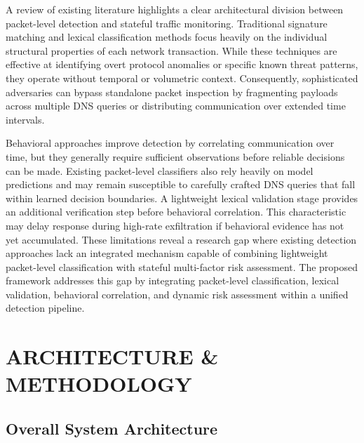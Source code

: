 \documentclass[14pt, a4paper, oneside]{report}
\begin{document}
A review of existing literature highlights a clear architectural division between packet-level detection and stateful traffic monitoring. Traditional signature matching and lexical classification methods focus heavily on the individual structural properties of each network transaction. While these techniques are effective at identifying overt protocol anomalies or specific known threat patterns, they operate without temporal or volumetric context. Consequently, sophisticated adversaries can bypass standalone packet inspection by fragmenting payloads across multiple DNS queries or distributing communication over extended time intervals.

Behavioral approaches improve detection by correlating communication over time, but they generally require sufficient observations before reliable decisions can be made. Existing packet-level classifiers also rely heavily on model predictions and may remain susceptible to carefully crafted DNS queries that fall within learned decision boundaries. A lightweight lexical validation stage provides an additional verification step before behavioral correlation. This characteristic may delay response during high-rate exfiltration if behavioral evidence has not yet accumulated. These limitations reveal a research gap where existing detection approaches lack an integrated mechanism capable of combining lightweight packet-level classification with stateful multi-factor risk assessment. The proposed framework addresses this gap by integrating packet-level classification, lexical validation, behavioral correlation, and dynamic risk assessment within a unified detection pipeline.

\chapter{ARCHITECTURE \& METHODOLOGY}
\label{chapt:architecture}

\section{Overall System Architecture}
\label{sec:system_overview}
\end{document}
